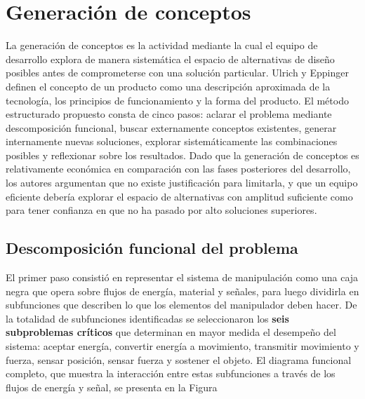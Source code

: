 \section{Generación de conceptos}

La generación de conceptos es la actividad mediante la cual el equipo de desarrollo explora de manera sistemática el espacio de alternativas de diseño posibles antes de comprometerse con una solución particular. Ulrich y Eppinger~\cite{Ulrich-Eppinger} definen el concepto de un producto como una descripción aproximada de la tecnología, los principios de funcionamiento y la forma del producto. El método estructurado propuesto consta de cinco pasos: aclarar el problema mediante descomposición funcional, buscar externamente conceptos existentes, generar internamente nuevas soluciones, explorar sistemáticamente las combinaciones posibles y reflexionar sobre los resultados. Dado que la generación de conceptos es relativamente económica en comparación con las fases posteriores del desarrollo, los autores argumentan que no existe justificación para limitarla, y que un equipo eficiente debería explorar el espacio de alternativas con amplitud suficiente como para tener confianza en que no ha pasado por alto soluciones superiores.

\subsection{Descomposición funcional del problema}

El primer paso consistió en representar el sistema de manipulación como una caja negra que opera sobre flujos de energía, material y señales, para luego dividirla en subfunciones que describen lo que los elementos del manipulador deben hacer. De la totalidad de subfunciones identificadas se seleccionaron los \textbf{seis subproblemas críticos} que determinan en mayor medida el desempeño del sistema: aceptar energía, convertir energía a movimiento, transmitir movimiento y fuerza, sensar posición, sensar fuerza y sostener el objeto. El diagrama funcional completo, que muestra la interacción entre estas subfunciones a través de los flujos de energía y señal, se presenta en la Figura%


